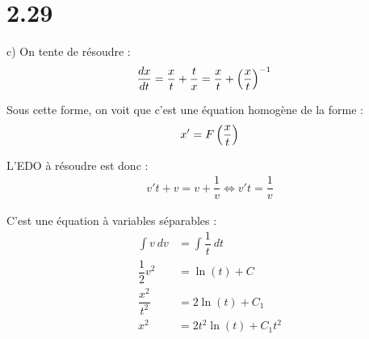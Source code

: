 \section*{2.29}

c) On tente de résoudre :
\begin{align*}
    \dfrac{dx}{dt} &= \dfrac{x}{t} + \dfrac{t}{x} =
    \dfrac{x}{t} + \left({\dfrac{x}{t}}\right)^{-1}
\end{align*}

Sous cette forme, on voit que c'est une équation homogène de la forme :
\begin{align*}
    x' = F\left({\dfrac{x}{t}}\right)
\end{align*}

L'EDO à résoudre est donc :
\begin{align*}
    v't + v = v +\dfrac{1}{v} \iff v't = \dfrac{1}{v}
\end{align*}

C'est une équation à variables séparables :
\begin{align*}
    \int{v\ dv} &= \int{\dfrac{1}{t}\ dt} \\
    \dfrac{1}{2}v^2 &= \ln(t) + C \\
    \dfrac{x^2}{t^2} &= 2\ln(t) + C_1 \\
    x^2 &= 2t^2\ln(t) + C_1t^2
\end{align*}
